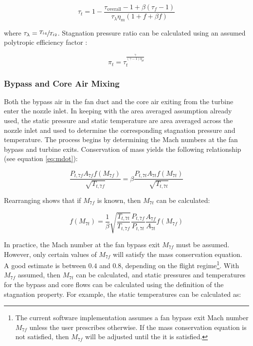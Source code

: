 \documentclass{article}
\begin{document}
\begin{equation*}
\tau_t = 1 - \frac{\tau_{\textrm{overall}} - 1 + \beta \left( \tau_f - 1 \right) }{\tau_{\lambda} \eta_m \left( 1 + f + \beta f \right)}
\end{equation*}

where $\tau_{\lambda} = \sfrac{T_{t4}}{T_{t2}}$. Stagnation pressure ratio can be calculated using an assumed polytropic efficiency factor \cite{cantwell283}:

\begin{equation*}
\pi_t = \tau_t^{\frac{\gamma}{(\gamma - 1) \eta_{pt}}}
\end{equation*}

\subsubsection{Bypass and Core Air Mixing}
\label{sec:mixing}

Both the bypass air in the fan duct and the core air exiting from the turbine enter the nozzle inlet. In keeping with the area averaged assumption already used, the static pressure and static temperature are area averaged across the nozzle inlet and used to determine the corresponding stagnation pressure and temperature. The process begins by determining the Mach numbers at the fan bypass and turbine exits. Conservation of mass yields the following relationship (see equation \ref{eq:mdot}):

\begin{equation*}
\frac{P_{t,7f} A_{7f} f \left( M_{7f} \right) }{ \sqrt{T_{t,7f}}} = \beta \frac{P_{t,7t} A_{7t} f \left( M_{7t} \right) }{ \sqrt{T_{t,7t}}}
\end{equation*}

Rearranging shows that if $M_{7f}$ is known, then $M_{7t}$ can be calculated:

\begin{equation*}
f(M_{7t}) = \frac{1}{\beta} \sqrt{\frac{T_{t,7t}}{T_{t,7f}}} \frac{P_{t,7f}}{P_{t,7t}} \frac{A_{7f}}{A_{7t}} f( M_{7f})
\end{equation*}

In practice, the Mach number at the fan bypass exit $M_{7f}$ must be assumed. However, only certain values of $M_{7f}$ will satisfy the mass conservation equation. A good estimate is between $0.4$ and $0.8$, depending on the flight regime\footnote{The current software implementation assumes a fan bypass exit Mach number $M_{7f}$ unless the user prescribes otherwise. If the mass conservation equation is not satisfied, then $M_{7f}$ will be adjusted until the it is satisfied.}. With $M_{7f}$ assumed, then $M_{7t}$ can be calculated, and static pressures and temperatures for the bypass and core flows can be calculated using the definition of the stagnation property. For example, the static temperatures can be calculated as:
\end{document}
